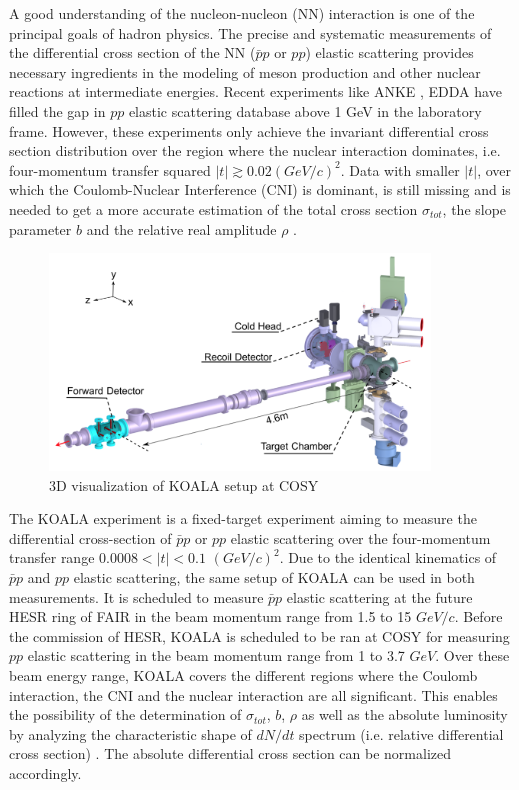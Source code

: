 \documentclass[number,5p]{elsarticle}
\begin{document}
A good understanding of the nucleon-nucleon (NN) interaction is one of the principal goals of hadron physics.
The precise and systematic measurements of the differential cross section of the
NN ($\bar{p}p$ or $pp$) elastic scattering provides necessary ingredients
in the modeling of meson production and other nuclear reactions at intermediate energies.
Recent experiments like ANKE \cite{ANKE}, EDDA \cite{EDDA} have filled the gap
in $pp$ elastic scattering database above 1 GeV in the laboratory frame.
However, these experiments only achieve the invariant differential cross section distribution over the region where the nuclear interaction dominates, 
i.e. four-momentum transfer squared \(|t| \gtrsim 0.02 (GeV/c)^2\).
Data with smaller \(|t|\), over which the Coulomb-Nuclear Interference (CNI) is
dominant, is still missing and is needed to get a more accurate estimation of
the total cross section \({\sigma}_{tot}\), the slope parameter \(b\) and the
relative real amplitude \(\rho\) \cite{RevModPhys.57.563}.

\begin{figure}[htbp]
	\centering
	\includegraphics[width=0.9\textwidth]{./koala_setup.png}
	\caption{3D visualization of KOALA setup at COSY}
	\label{fig:setup}
\end{figure}

The KOALA experiment is a fixed-target experiment aiming to measure the
differential cross-section of $\bar{p}p$ or $pp$ elastic scattering
over the four-momentum transfer range \(0.0008 < |t| < 0.1\) \((GeV/c)^2\).
Due to the identical kinematics of $\bar{p}p$ and $pp$ elastic scattering, the
same setup of KOALA can be used in both measurements.
It is scheduled to measure $\bar{p}p$ elastic
scattering at the future HESR ring of FAIR \cite{FAIR} in the beam momentum range from
1.5 to 15 $GeV/c$.
Before the commission of HESR, KOALA is scheduled to be ran at COSY \cite{COSY}
for measuring $pp$ elastic scattering in the beam momentum range from 1 to 3.7 $GeV$.
Over these beam energy range, KOALA covers the different regions where the Coulomb interaction, the CNI and the nuclear interaction are all significant.
This enables the possibility of the determination of \({\sigma}_{tot}\), \(b\), \(\rho\) as well as
the absolute luminosity by analyzing the characteristic shape of $dN/dt$
spectrum (i.e. relative differential cross section) \cite{bernard1987real,
  jenni2008atlas, recoil_article}.
The absolute differential cross section can be normalized accordingly.
\end{document}
